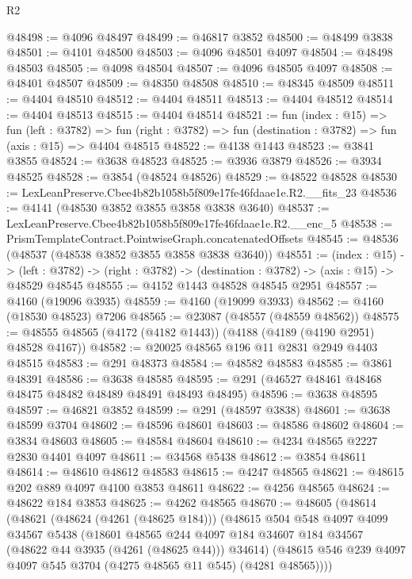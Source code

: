 \begin{lexlean}{R2}
\begin{coremodule}
@48498 := @4096 @48497
@48499 := @46817 @3852
@48500 := @48499 @3838
@48501 := @4101 @48500
@48503 := @4096 @48501 @4097
@48504 := @48498 @48503
@48505 := @4098 @48504
@48507 := @4096 @48505 @4097
@48508 := @48401 @48507
@48509 := @48350 @48508
@48510 := @48345 @48509
@48511 := @4404 @48510
@48512 := @4404 @48511
@48513 := @4404 @48512
@48514 := @4404 @48513
@48515 := @4404 @48514
@48521 := fun (index : @15) =>
  fun (left : @3782) =>
  fun (right : @3782) => fun (destination : @3782) => fun (axis : @15) => @4404 @48515
@48522 := @4138 @1443
@48523 := @3841 @3855
@48524 := @3638 @48523
@48525 := @3936 @3879
@48526 := @3934 @48525
@48528 := @3854 (@48524 @48526)
@48529 := @48522 @48528
@48530 := LexLeanPreserve.Cbee4b82b1058b5f809e17fe46fdaae1e.R2.__fits_23
@48536 := @4141 (@48530 @3852 @3855 @3858 @3838 @3640)
@48537 := LexLeanPreserve.Cbee4b82b1058b5f809e17fe46fdaae1e.R2.__enc_5
@48538 := PrismTemplateContract.PointwiseGraph.concatenatedOffsets
@48545 := @48536 (@48537 (@48538 @3852 @3855 @3858 @3838 @3640))
@48551 := (index : @15) ->
  (left : @3782) -> (right : @3782) -> (destination : @3782) -> (axis : @15) -> @48529 @48545
@48555 := @4152 @1443 @48528 @48545 @2951
@48557 := @4160 (@19096 @3935)
@48559 := @4160 (@19099 @3933)
@48562 := @4160 (@18530 @48523) @7206
@48565 := @23087 (@48557 (@48559 @48562))
@48575 := @48555 @48565 (@4172 (@4182 @1443)) (@4188 (@4189 (@4190 @2951) @48528 @4167))
@48582 := @20025 @48565 @196 @11 @2831 @2949 @4403 @48515
@48583 := @291 @48373
@48584 := @48582 @48583
@48585 := @3861 @48391
@48586 := @3638 @48585
@48595 := @291 (@46527 @48461 @48468 @48475 @48482 @48489 @48491 @48493 @48495)
@48596 := @3638 @48595
@48597 := @46821 @3852
@48599 := @291 (@48597 @3838)
@48601 := @3638 @48599 @3704
@48602 := @48596 @48601
@48603 := @48586 @48602
@48604 := @3834 @48603
@48605 := @48584 @48604
@48610 := @4234 @48565 @2227 @2830 @4401 @4097
@48611 := @34568 @5438
@48612 := @3854 @48611
@48614 := @48610 @48612 @48583
@48615 := @4247 @48565
@48621 := @48615 @202 @889 @4097 @4100 @3853 @48611
@48622 := @4256 @48565
@48624 := @48622 @184 @3853
@48625 := @4262 @48565
@48670 := @48605
    (@48614
      (@48621
        (@48624 (@4261 (@48625 @184)))
        (@48615
          @504
          @548
          @4097
          @4099
          @34567
          @5438
          (@18601
            @48565
            @244
            @4097
            @184
            @34607
            @184
            @34567
            (@48622 @44 @3935 (@4261 (@48625 @44)))
            @34614)
          (@48615 @546 @239 @4097 @4097 @545 @3704 (@4275 @48565 @11 @545) (@4281 @48565))))

\end{coremodule}
\end{lexlean}
